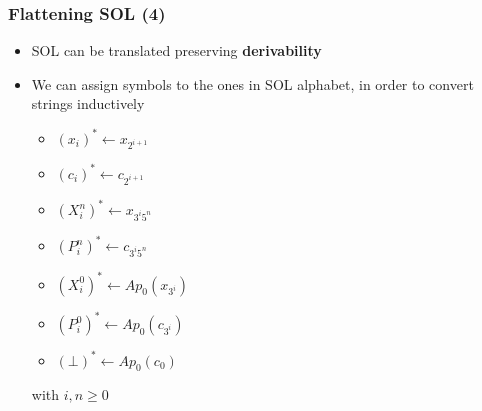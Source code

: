\documentclass{beamer}
\begin{document}
                \begin{frame}
                    \frametitle{Flattening SOL (4)}
                    \begin{itemize}
                        \item SOL can be translated preserving \textbf{derivability}
                        \item We can assign symbols to the ones in SOL alphabet, in order to convert strings inductively
                        \begin{itemize}
                            \item $ (x_i)^* \leftarrow x_{2^{i + 1}} $
                            \item $ (c_i)^* \leftarrow c_{2^{i + 1}} $
                            \item $ (X^n_i)^* \leftarrow x_{3^i5^n} $
                            \item $ (P^n_i)^* \leftarrow c_{3^i5^n} $
                            \item $ (X^0_i)^* \leftarrow Ap_0(x_{3^i}) $
                            \item $ (P^0_i)^* \leftarrow Ap_0(c_{3^i}) $
                            \item $ (\bot)^* \leftarrow Ap_0(c_0) $
                        \end{itemize}
                        with $ i,n \geq 0 $
                    \end{itemize}
                \end{frame}
\end{document}
